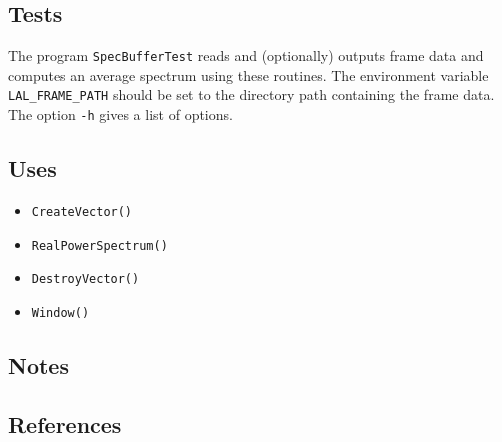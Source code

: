 \documentclass{article}
\begin{document}
\subsection{Tests}

The program \texttt{SpecBufferTest} reads and (optionally) outputs frame data
and computes an average spectrum using these routines.  The environment
variable \texttt{LAL\_FRAME\_PATH} should be set to the directory path
containing the frame data.  The option \texttt{-h} gives a list of options.

\subsection{Uses}

\begin{itemize}
\item\texttt{CreateVector()}
\item\texttt{RealPowerSpectrum()}
\item\texttt{DestroyVector()}
\item\texttt{Window()}
\end{itemize}

\subsection{Notes}

\subsection{References}
\end{document}
